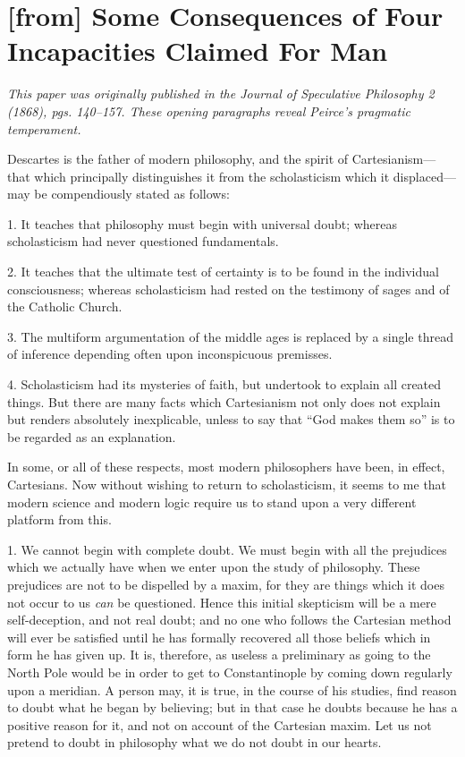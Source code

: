 
\section*{[from] Some Consequences of Four Incapacities Claimed For Man}
\emph{This paper was originally published in the \emph{Journal of Speculative Philosophy} 2 (1868), pgs. 140--157. These opening paragraphs reveal Peirce's pragmatic temperament.}

Descartes is the father of modern philosophy, and the spirit of Cartesianism--- that which principally distinguishes it from the scholasticism which it displaced--- may be compendiously stated as follows:

1. It teaches that philosophy must begin with universal doubt; whereas scholasticism had never questioned fundamentals.

2. It teaches that the ultimate test of certainty is to be found in the individual consciousness; whereas scholasticism had rested on the testimony of sages and of the Catholic Church.

3. The multiform argumentation of the middle ages is replaced by a single thread of inference depending often upon inconspicuous premisses.

4. Scholasticism had its mysteries of faith, but undertook to explain all created things. But there are many facts which Cartesianism not only does not explain but renders absolutely inexplicable, unless to say that ``God makes them so'' is to be regarded as an explanation.

In some, or all of these respects, most modern philosophers have been, in effect, Cartesians. Now without wishing to return to scholasticism, it seems to me that modern science and modern logic require us to stand upon a very different platform from this.

1. We cannot begin with complete doubt. We must begin with all the prejudices which we actually have when we enter upon the study of philosophy. These prejudices are not to be dispelled by a maxim, for they are things which it does not occur to us \emph{can} be questioned. Hence this initial skepticism will be a mere self-deception, and not real doubt; and no one who follows the Cartesian method will ever be satisfied until he has formally recovered all those beliefs which in form he has given up. It is, therefore, as useless a preliminary as going to the North Pole would be in order to get to Constantinople by coming down regularly upon a meridian. A person may, it is true, in the course of his studies, find reason to doubt what he began by believing; but in that case he doubts because he has a positive reason for it, and not on account of the Cartesian maxim. Let us not pretend to doubt in philosophy what we do not doubt in our hearts.


